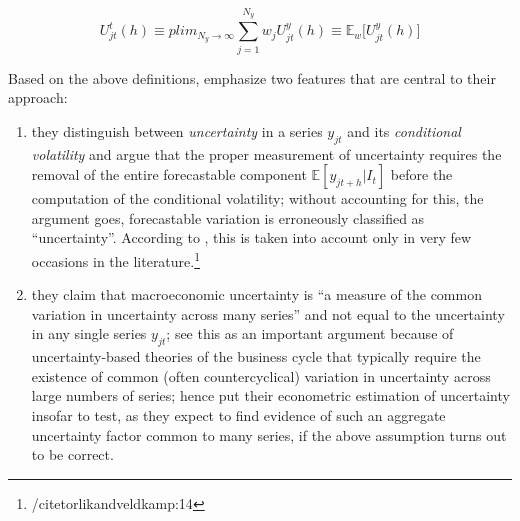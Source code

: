\documentclass[a4paper,11pt,listof=nochaptergap,oneside,pointednumbers,bibtotoc,bigheadings,liststotoc,hidelinks]{scrbook}
\theoremstyle{mysatz}
\theoremstyle{mydefinition}
\theoremstyle{mytheorem}
\theoremstyle{mybemerkung}
\begin{document}
\begin{equation} \label{eq:juradoetal_2}
U^t_{jt}(h) \equiv plim_{N_{y}\to\infty} \sum_{j=1}^{N_y} w_j U_{jt}^y(h) \equiv \mathbb{E}_w \Big[U_{jt}^y(h)\Big]
\end{equation}

Based on the above definitions, \citet{juradoetal:15} emphasize two features that are central to their approach:
\begin{enumerate}
	\item they distinguish between \textit{uncertainty} in a series $y_{jt}$ and its \textit{conditional volatility} and argue that the proper measurement of uncertainty requires the removal of the entire forecastable component $\mathbb{E}[y_{jt+h}|I_t]$ before the computation of the conditional volatility; without accounting for this, the argument goes, forecastable variation is erroneously classified as ``uncertainty''. According to \citet{juradoetal:15}, this is taken into account only in very few occasions in the literature.\footnote{/citet{orlikandveldkamp:14} }
	\item they claim that macroeconomic uncertainty is ``a measure of the common variation in uncertainty across many series'' and not equal to the uncertainty in any single series $y_{jt}$; \citet{juradoetal:15} see this as an important argument because of uncertainty-based theories of the business cycle that typically require the existence of common (often countercyclical) variation in uncertainty across large numbers of series; \citet{juradoetal:15} hence put their econometric estimation of uncertainty insofar to test, as they expect to find evidence of such an aggregate uncertainty factor common to many series, if the above assumption turns out to be correct.
\end{enumerate}
\end{document}
